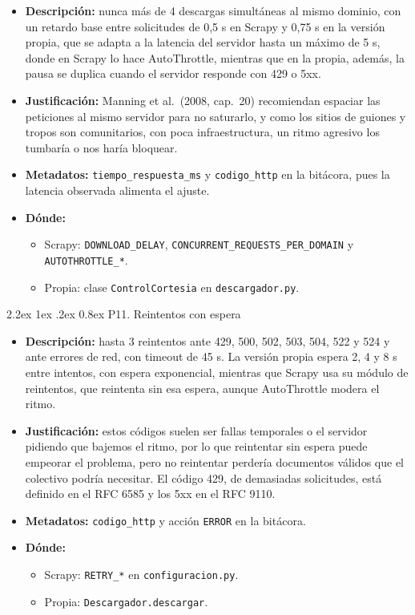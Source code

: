 \documentclass[11pt,spanish]{article}
\makeatletter
\renewcommand\paragraph{\@startsection{paragraph}{4}{\z@}%
  {2.2ex \@plus1ex \@minus.2ex}%
  {0.8ex}%
  {\normalfont\normalsize\bfseries}}
\makeatother
\begin{document}
\begin{itemize}[label=\textbullet, leftmargin=*]
    \item \textbf{Descripción:} nunca más de 4 descargas simultáneas al mismo dominio, con un retardo base entre solicitudes de 0,5 s en Scrapy y 0,75 s en la versión propia, que se adapta a la latencia del servidor hasta un máximo de 5 s, donde en Scrapy lo hace AutoThrottle, mientras que en la propia, además, la pausa se duplica cuando el servidor responde con 429 o 5xx.
    \item \textbf{Justificación:} Manning et al.\ (2008, cap.\ 20) recomiendan espaciar las peticiones al mismo servidor para no saturarlo, y como los sitios de guiones y tropos son comunitarios, con poca infraestructura, un ritmo agresivo los tumbaría o nos haría bloquear.
    \item \textbf{Metadatos:} \texttt{tiempo\_respuesta\_ms} y \texttt{codigo\_http} en la bitácora, pues la latencia observada alimenta el ajuste.
    \item \textbf{Dónde:}
    \begin{itemize}[label=--, leftmargin=*]
        \item Scrapy: \texttt{DOWNLOAD\_DELAY}, \texttt{CONCURRENT\_REQUESTS\_PER\_DOMAIN} y \texttt{AUTOTHROTTLE\_*}.
        \item Propia: clase \texttt{ControlCortesia} en \texttt{descargador.py}.
    \end{itemize}
\end{itemize}

\paragraph{P11. Reintentos con espera}

\begin{itemize}[label=\textbullet, leftmargin=*]
    \item \textbf{Descripción:} hasta 3 reintentos ante 429, 500, 502, 503, 504, 522 y 524 y ante errores de red, con timeout de 45 s. La versión propia espera 2, 4 y 8 s entre intentos, con espera exponencial, mientras que Scrapy usa su módulo de reintentos, que reintenta sin esa espera, aunque AutoThrottle modera el ritmo.
    \item \textbf{Justificación:} estos códigos suelen ser fallas temporales o el servidor pidiendo que bajemos el ritmo, por lo que reintentar sin espera puede empeorar el problema, pero no reintentar perdería documentos válidos que el colectivo podría necesitar. El código 429, de demasiadas solicitudes, está definido en el RFC 6585 y los 5xx en el RFC 9110.
    \item \textbf{Metadatos:} \texttt{codigo\_http} y acción \texttt{ERROR} en la bitácora.
    \item \textbf{Dónde:}
    \begin{itemize}[label=--, leftmargin=*]
        \item Scrapy: \texttt{RETRY\_*} en \texttt{configuracion.py}.
        \item Propia: \texttt{Descargador.descargar}.
    \end{itemize}
\end{itemize}
\end{document}
